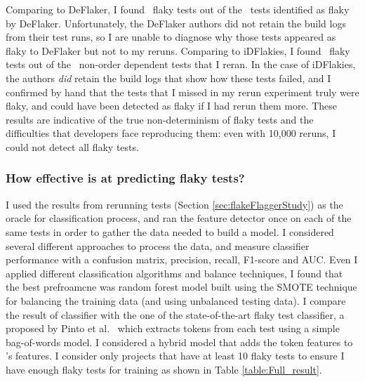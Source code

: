 Comparing to DeFlaker, I found ~flaky tests out of the ~tests identified as flaky by DeFlaker.
Unfortunately, the DeFlaker authors did not retain the build logs from their test runs, so I are unable to diagnose why those tests appeared as flaky to DeFlaker but not to my reruns.
Comparing to iDFlakies, I found \idflakiesCommonFlaky~flaky tests out of the \idflakiesRerunFlaky~non-order dependent tests that I reran.
In the case of iDFlakies, the authors \emph{did} retain the build logs that show how these tests failed, and I confirmed by hand that the tests that I missed in my rerun experiment truly were flaky, and could have been detected as flaky if I had rerun them more.
These results are indicative of the true non-determinism of flaky tests and the difficulties that developers face reproducing them: even with 10,000 reruns, I could not detect all flaky tests.








\subsubsection{How effective is \sysName at predicting flaky tests?} 
\label{FlakeFlaggerRQ3}

I used the results from rerunning tests (Section \ref{sec:flakeFlaggerStudy}) as the oracle for \sysName classification process, and ran the feature detector once on each of the same tests in order to gather the data needed to build a model.
I considered several different approaches to process the data, and measure classifier performance with a confusion matrix, precision, recall, F1-score and AUC. Even I applied different classification algorithms and balance techniques, I found that the best prefroamcne was  random forest model built using the SMOTE technique for balancing the training data (and using unbalanced testing data). I compare the result of \sysName classifier with the one of the state-of-the-art flaky test classifier, a \vocabName proposed by Pinto et al.~\cite{pinto2020vocabulary} which extracts tokens from each test using a simple bag-of-words model. I considered a hybrid model that adds the token features to \sysName's features. I consider only projects that have at least 10 flaky tests to ensure I have enough flaky tests for training as shown in Table \ref{table:Full_result}. 

